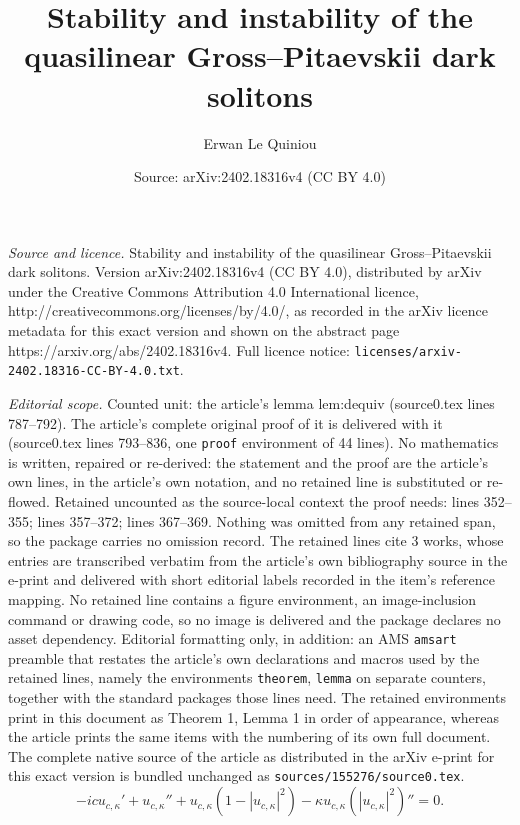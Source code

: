 \documentclass[10pt,a4paper]{amsart}
\title{Stability and instability of the quasilinear Gross--Pitaevskii dark solitons}
\author{Erwan Le Quiniou}
\date{Source: arXiv:2402.18316v4 (CC BY 4.0)}
\begin{document}
\maketitle

\noindent\emph{Source and licence.} Stability and instability of the quasilinear Gross--Pitaevskii dark solitons. Version arXiv:2402.18316v4 (CC BY 4.0), distributed by arXiv under the Creative Commons Attribution 4.0 International licence, http://creativecommons.org/licenses/by/4.0/, as recorded in the arXiv licence metadata for this exact version and shown on the abstract page https://arxiv.org/abs/2402.18316v4. Full licence notice: \texttt{licenses/arxiv-2402.18316-CC-BY-4.0.txt}.\par\smallskip

\noindent\textit{Editorial scope.} Counted unit: the article's lemma lem:dequiv (source0.tex lines 787--792). The article's complete original proof of it is delivered with it (source0.tex lines 793--836, one \texttt{proof} environment of 44 lines). No mathematics is written, repaired or re-derived: the statement and the proof are the article's own lines, in the article's own notation, and no retained line is substituted or re-flowed.  Retained uncounted as the source-local context the proof needs: lines 352--355; lines 357--372; lines 367--369.  Nothing was omitted from any retained span, so the package carries no omission record.  The retained lines cite 3 works, whose entries are transcribed verbatim from the article's own bibliography source in the e-print and delivered with short editorial labels recorded in the item's reference mapping.  No retained line contains a figure environment, an image-inclusion command or drawing code, so no image is delivered and the package declares no asset dependency.  Editorial formatting only, in addition: an AMS \texttt{amsart} preamble that restates the article's own declarations and macros used by the retained lines, namely the environments \texttt{theorem}, \texttt{lemma} on separate counters, together with the standard packages those lines need.  The retained environments print in this document as Theorem 1, Lemma 1 in order of appearance, whereas the article prints the same items with the numbering of its own full document.  The complete native source of the article as distributed in the arXiv e-print for this exact version is bundled unchanged as \texttt{sources/155276/source0.tex}.
	\begin{equation}
		\label{TWc}\tag{TW$(c,\kappa)$}
		-icu_{c,\kappa}'+u_{c,\kappa}''+u_{c,\kappa} (1-|u_{c,\kappa}|^2)-\kappa u_{c,\kappa}\left(|u_{c,\kappa}|^2\right)''=0.
	\end{equation}
\end{document}
